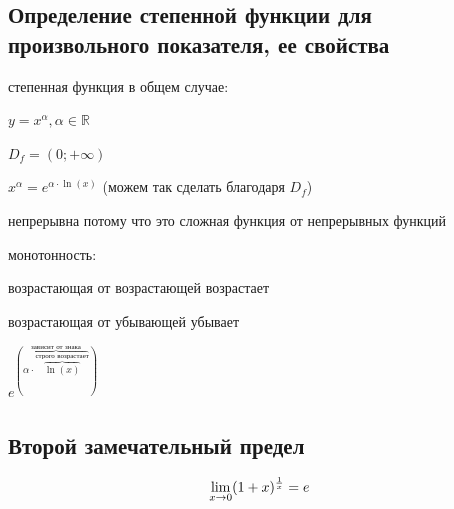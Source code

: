 \subsection{Определение степенной функции для произвольного показателя, ее свойства}

\begin{theorem}

степенная функция в общем случае:

$y=x^{\alpha}, \alpha \in \mathbb{R}$

$D_f = (0; +\infty)$

$x^{\alpha}=e^{\alpha \cdot \ln(x)}$ (можем так сделать благодаря $D_f$)

непрерывна потому что это сложная функция от непрерывных функций 

монотонность:

возрастающая от возрастающей возрастает

возрастающая от убывающей убывает

$e^{(\overbrace{\alpha \cdot \overbrace{\ln(x)}^{\text{строго возрастает}}}^{\text{зависит от знака}})}$


\end{theorem}

\subsection{Второй замечательный предел}

\begin{theorem}
\[
	\lim\limits_{x \to 0} (1 + x)^\frac{1}{x} = e
\]
\end{theorem}

